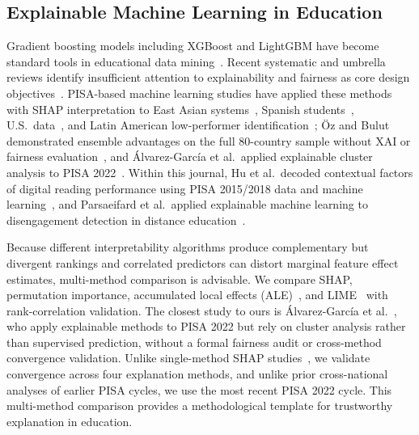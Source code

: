 \documentclass[journal]{IEEEtran}
\begin{document}
\subsection{Explainable Machine Learning in Education}
Gradient boosting models including XGBoost and LightGBM have become standard tools in educational data mining~\cite{Chen_Guestrin_2016,Ke_2017}. Recent systematic and umbrella reviews identify insufficient attention to explainability and fairness as core design objectives~\cite{pan2025survey}. PISA-based machine learning studies have applied these methods with SHAP interpretation to East Asian systems~\cite{Huang_2024}, Spanish students~\cite{Gomez_Talal_2025}, U.S.\ data~\cite{Zhu_2025_US_PISA}, and Latin American low-performer identification~\cite{PISA_2022_XAI_low_performers}; \"{O}z and Bulut demonstrated ensemble advantages on the full 80-country sample without XAI or fairness evaluation~\cite{Oz_2025_stacking}, and \'Alvarez-Garc\'ia et al.\ applied explainable cluster analysis to PISA 2022~\cite{ce2024profiles}. Within this journal, Hu et al.\ decoded contextual factors of digital reading performance using PISA 2015/2018 data and machine learning~\cite{hu2023decoding}, and Parsaeifard et al.\ applied explainable machine learning to disengagement detection in distance education~\cite{parsaeifard2026disengagement}.

Because different interpretability algorithms produce complementary but divergent rankings and correlated predictors can distort marginal feature effect estimates, multi-method comparison is advisable. We compare SHAP, permutation importance, accumulated local effects (ALE)~\cite{Apley_Zhu_2020}, and LIME~\cite{Ribeiro_2016} with rank-correlation validation. The closest study to ours is \'Alvarez-Garc\'ia et al.~\cite{ce2024profiles}, who apply explainable methods to PISA 2022 but rely on cluster analysis rather than supervised prediction, without a formal fairness audit or cross-method convergence validation. Unlike single-method SHAP studies~\cite{Gomez_Talal_2025,PISA_2022_XAI_low_performers}, we validate convergence across four explanation methods, and unlike prior cross-national analyses of earlier PISA cycles, we use the most recent PISA 2022 cycle. This multi-method comparison provides a methodological template for trustworthy explanation in education.
\end{document}
